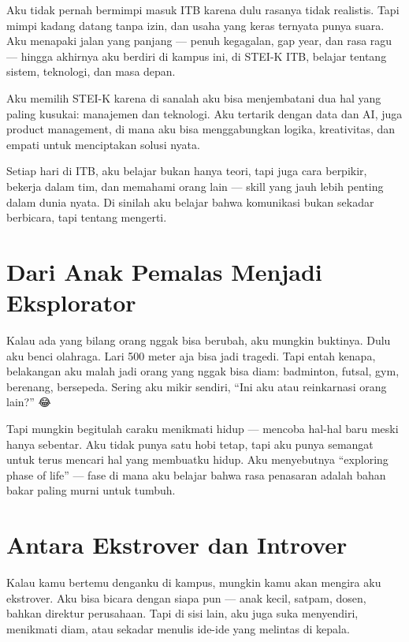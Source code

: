 \documentclass[
  letterpaper,
  DIV=11,
  numbers=noendperiod]{scrreprt}
\begin{document}
Aku tidak pernah bermimpi masuk ITB karena dulu rasanya tidak realistis.
Tapi mimpi kadang datang tanpa izin, dan usaha yang keras ternyata punya
suara. Aku menapaki jalan yang panjang --- penuh kegagalan, gap year,
dan rasa ragu --- hingga akhirnya aku berdiri di kampus ini, di STEI-K
ITB, belajar tentang sistem, teknologi, dan masa depan.

Aku memilih STEI-K karena di sanalah aku bisa menjembatani dua hal yang
paling kusukai: manajemen dan teknologi. Aku tertarik dengan data dan
AI, juga product management, di mana aku bisa menggabungkan logika,
kreativitas, dan empati untuk menciptakan solusi nyata.

Setiap hari di ITB, aku belajar bukan hanya teori, tapi juga cara
berpikir, bekerja dalam tim, dan memahami orang lain --- skill yang jauh
lebih penting dalam dunia nyata. Di sinilah aku belajar bahwa komunikasi
bukan sekadar berbicara, tapi tentang mengerti.

\section{Dari Anak Pemalas Menjadi
Eksplorator}\label{dari-anak-pemalas-menjadi-eksplorator}

Kalau ada yang bilang orang nggak bisa berubah, aku mungkin buktinya.
Dulu aku benci olahraga. Lari 500 meter aja bisa jadi tragedi. Tapi
entah kenapa, belakangan aku malah jadi orang yang nggak bisa diam:
badminton, futsal, gym, berenang, bersepeda. Sering aku mikir sendiri,
``Ini aku atau reinkarnasi orang lain?'' 😂

Tapi mungkin begitulah caraku menikmati hidup --- mencoba hal-hal baru
meski hanya sebentar. Aku tidak punya satu hobi tetap, tapi aku punya
semangat untuk terus mencari hal yang membuatku hidup. Aku menyebutnya
``exploring phase of life'' --- fase di mana aku belajar bahwa rasa
penasaran adalah bahan bakar paling murni untuk tumbuh.

\section{Antara Ekstrover dan
Introver}\label{antara-ekstrover-dan-introver}

Kalau kamu bertemu denganku di kampus, mungkin kamu akan mengira aku
ekstrover. Aku bisa bicara dengan siapa pun --- anak kecil, satpam,
dosen, bahkan direktur perusahaan. Tapi di sisi lain, aku juga suka
menyendiri, menikmati diam, atau sekadar menulis ide-ide yang melintas
di kepala.
\end{document}
